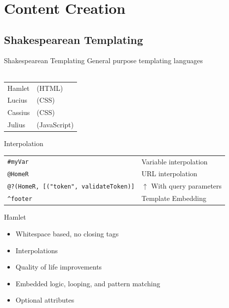 \documentclass[pdf]{beamer}
\begin{document}
\section{Content Creation}
\subsection{Shakespearean Templating}
\begin{frame}{Shakespearean Templating}
  General purpose templating languages\\
  \\
  \begin{tabular}{ l l }
    Hamlet  & (HTML)\\
    Lucius  & (CSS)\\
    Cassius & (CSS)\\
    Julius  & (JavaScript)\\
  \end{tabular}
\end{frame}

\begin{frame}[fragile]{Interpolation}
  \begin{tabular} { l l }
    \texttt{#{myVar}}                               & Variable interpolation \\
    \pause
    \texttt{@{HomeR}}                               & URL interpolation \\
    \pause
    \texttt{@?{(HomeR, [("token", validateToken)]}} & $\uparrow$ With query parameters \\
    \pause
    \texttt{^{footer}}                              & Template Embedding\\
  \end{tabular}
\end{frame}

\begin{frame}{Hamlet}
  \begin{itemize}
  \item<1-> Whitespace based, no closing tags\\
  \item<2-> Interpolations\\
  \item<3-> Quality of life improvements\\
  \item<4-> Embedded logic, looping, and pattern matching \\
  \item<5-> Optional attributes\\
  \end{itemize}
\end{frame}
\end{document}
